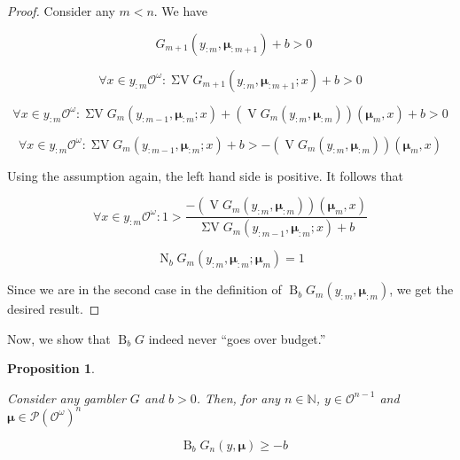 \documentclass[11pt]{article}
\theoremstyle{definition}
\theoremstyle{plain}
\newtheorem{proposition}{Proposition}%
\newcommand{\Nats}{\mathbb{N}}
\newcommand{\B}{\operatorname{B}}
\newcommand{\PM}{\mathcal{P}}
\newcommand{\Ob}{\mathcal{O}}
\newcommand{\OO}{\Ob^\omega}
\newcommand{\PMO}{\PM(\OO)}
\DeclareMathOperator{\V}{V}
\DeclareMathOperator{\SV}{\Sigma V}
\DeclareMathOperator{\SVM}{\Sigma V_{\min}}
\DeclareMathOperator{\Nr}{N}
\newcommand{\BM}{\bm{\mu}}
\begin{document}
\begin{proof}

Consider any $m < n$. We have

$$\SVM G_{m+1}(y_{:m},\BM_{:m+1}) + b > 0$$

$$\forall x \in y_{:m}\OO: \SV G_{m+1}(y_{:m},\BM_{:m+1}; x) + b > 0$$

$$\forall x \in y_{:m}\OO: \SV G_{m}(y_{:m-1},\BM_{:m}; x) + (\V G_{m}(y_{:m},\BM_{:m}))(\BM_{m}, x) + b > 0$$

$$\forall x \in y_{:m}\OO: \SV G_{m}(y_{:m-1},\BM_{:m}; x) + b > -(\V G_{m}(y_{:m},\BM_{:m}))(\BM_{m}, x)$$

Using the assumption again, the left hand side is positive. It follows that

$$\forall x \in y_{:m}\OO: 1 > \frac{-(\V G_{m}(y_{:m},\BM_{:m}))(\BM_{m}, x)}{\SV G_{m}(y_{:m-1},\BM_{:m}; x) + b}$$

$$\Nr_b G_m(y_{:m},\BM_{:m};\BM_m) = 1$$

Since we are in the second case in the definition of ${\B_b G_m(y_{:m},\BM_{:m})}$, we get the desired result.
\end{proof}

Now, we show that $\B_b G$ indeed never \enquote{goes over budget.}

\begin{proposition}
\label{prp:b_stays_in_budget}

Consider any gambler $G$ and $b > 0$. Then, for any $n \in \Nats$, $y \in \Ob^{n-1}$ and $\BM \in \PMO^n$

\begin{equation}
\SVM \B_b G_n(y,\BM) \geq -b
\end{equation} 

\end{proposition}
\end{document}
